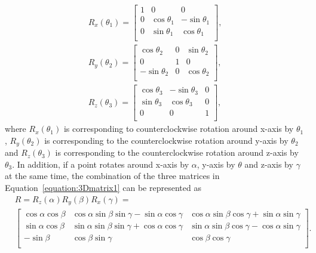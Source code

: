 \begin{equation}
\label{equation:3Dmatrix1}
\begin{aligned}
R_{x}(\theta_{1})=\begin{bmatrix}
1&          0&          0\\
0&\cos\theta_{1} & -\sin\theta_{1}\\
0&\sin\theta_{1} & \cos\theta_{1}\\
\end{bmatrix},
\\R_{y}(\theta_{2})=\begin{bmatrix}
  \cos\theta_{2}&          0&\sin\theta_{2}\\
           0&          1& 0\\
-\sin\theta_{2} &          0&\cos\theta_{2}\\
\end{bmatrix},
\\R_{z}(\theta_{3})=\begin{bmatrix}
\cos\theta_{3}&-\sin\theta_{3}&0\\
\sin\theta_{3}& \cos\theta_{3}&0\\
         0&          0&1\\
\end{bmatrix},
\end{aligned}
\end{equation}
where $R_{x}(\theta_{1})$ is corresponding to counterclockwise rotation around x-axis by $\theta_{1}$, $R_{y}(\theta_{2})$ is corresponding to the counterclockwise rotation around y-axis by $\theta_{2}$ and $R_{z}(\theta_{3})$ is corresponding to the counterclockwise rotation around z-axis by $\theta_{3}$. In addition, if a point rotates around x-axis by $\alpha$, y-axis by $\theta$ and z-axis by $\gamma$ at the same time, the combination of the three matrices in Equation~\ref{equation:3Dmatrix1} can be represented as
\begin{equation}
\label{equation:3Dmatrix2}
\begin{aligned}
&R=R_{z}(\alpha)R_{y}(\beta)R_{x}(\gamma)=\\
&\begin{bmatrix}
\cos\alpha\cos\beta&\cos\alpha\sin\beta\sin\gamma-\sin\alpha\cos\gamma&\cos\alpha\sin\beta\cos\gamma+\sin\alpha\sin\gamma\\
\sin\alpha\cos\beta&\sin\alpha\sin\beta\sin\gamma+\cos\alpha\cos\gamma&\sin\alpha\sin\beta\cos\gamma-\cos\alpha\sin\gamma\\
         -\sin\beta&                               \cos\beta\sin\gamma&\cos\beta\cos\gamma\\
\end{bmatrix}.
\end{aligned}
\end{equation}
